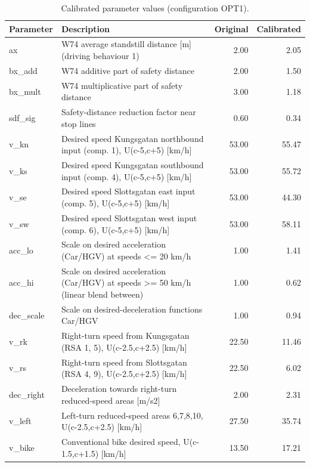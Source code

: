 \begin{table}[H]
\centering
\caption{Calibrated parameter values (configuration OPT1).}
\begin{tabular}{llrr}
\toprule
\textbf{Parameter} & \textbf{Description} & \textbf{Original} & \textbf{Calibrated}\\
\midrule
ax & W74 average standstill distance [m] (driving behaviour 1) & 2.00 & 2.05\\
bx\_add & W74 additive part of safety distance & 2.00 & 1.50\\
bx\_mult & W74 multiplicative part of safety distance & 3.00 & 1.18\\
sdf\_sig & Safety-distance reduction factor near stop lines & 0.60 & 0.34\\
v\_kn & Desired speed Kungsgatan northbound input (comp. 1), U(c-5,c+5) [km/h] & 53.00 & 55.47\\
v\_ks & Desired speed Kungsgatan southbound input (comp. 4), U(c-5,c+5) [km/h] & 53.00 & 55.72\\
v\_se & Desired speed Slottsgatan east input (comp. 5), U(c-5,c+5) [km/h] & 53.00 & 44.30\\
v\_sw & Desired speed Slottsgatan west input (comp. 6), U(c-5,c+5) [km/h] & 53.00 & 58.11\\
acc\_lo & Scale on desired acceleration (Car/HGV) at speeds <= 20 km/h & 1.00 & 1.41\\
acc\_hi & Scale on desired acceleration (Car/HGV) at speeds >= 50 km/h (linear blend between) & 1.00 & 0.62\\
dec\_scale & Scale on desired-deceleration functions Car/HGV & 1.00 & 0.94\\
v\_rk & Right-turn speed from Kungsgatan (RSA 1, 5), U(c-2.5,c+2.5) [km/h] & 22.50 & 11.46\\
v\_rs & Right-turn speed from Slottsgatan (RSA 4, 9), U(c-2.5,c+2.5) [km/h] & 22.50 & 6.02\\
dec\_right & Deceleration towards right-turn reduced-speed areas [m/s2] & 2.00 & 2.31\\
v\_left & Left-turn reduced-speed areas 6,7,8,10, U(c-2.5,c+2.5) [km/h] & 27.50 & 35.74\\
v\_bike & Conventional bike desired speed, U(c-1.5,c+1.5) [km/h] & 13.50 & 17.21\\
\bottomrule
\end{tabular}
\end{table}

